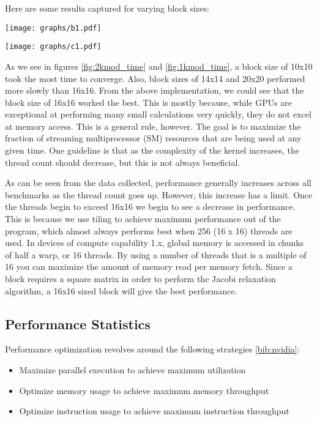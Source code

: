 \documentclass[10pt]{article}
\makeatletter
\newenvironment{figurehere}
{\def\@captype{figure}}
{}
\makeatother
\begin{document}
\begin{multicols}{2}
  Here are some results captured for varying block sizes:

  \begin{figurehere}
    \centering
    \texttt{[image: graphs/b1.pdf]}
    \caption{}
    \label{fig:2kmod_time}
  \end{figurehere}

  \begin{figurehere}
    \centering
    \texttt{[image: graphs/c1.pdf]}
    \caption{}
    \label{fig:1kmod_time}
  \end{figurehere}

  As we see in figures \ref{fig:2kmod_time} and \ref{fig:1kmod_time}, a block size of 10x10 took the most time to converge.
  Also, block sizes of 14x14 and 20x20 performed more slowly than 16x16.
  From the above implementation, we could see that the block size of 16x16 worked the best.
  This is mostly because, while GPUs are exceptional at performing many small calculations very quickly, they do not excel at memory access.
  This is a general rule, however.
  The goal is to maximize the fraction of streaming multiprocessor (SM) resources that are being used at any given time.
  One guideline is that as the complexity of the kernel increases, the thread count should decrease, but this is not always beneficial.

  As can be seen from the data collected, performance generally increases across all benchmarks as the thread count goes up.
  However, this increase has a limit.
  Once the threads begin to exceed 16x16 we begin to see a decrease in performance.
  This is because we use tiling to achieve maximum performance out of the program, which almost always performs best when 256 (16 x 16) threads are used.
  In devices of compute capability 1.x, global memory is accessed in chunks of half a warp, or 16 threads.
  By using a number of threads that is a multiple of 16 you can maximize the amount of memory read per memory fetch.
  Since a block requires a square matrix in order to perform the Jacobi relaxation algorithm, a 16x16 sized block will give the best performance.

  \subsection{Performance Statistics}
  Performance optimization revolves around the following strategies \ref{bib:nvidia}:
  \begin{itemize}
    \item Maximize parallel execution to achieve maximum utilization
    \item Optimize memory usage to achieve maximum memory throughput 
    \item Optimize instruction usage to achieve maximum instruction throughput 
  \end{itemize}


\end{multicols}
\end{document}
